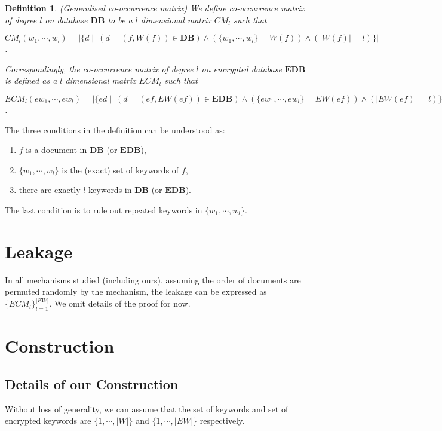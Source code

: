 \documentclass{article}
\newcommand{\db}{\textbf{DB}}
\newcommand{\edb}{\textbf{EDB}}
\newcommand{\doc}{d}
\newcommand{\edoc}{ed}
\newcommand{\file}{f}
\newcommand{\efile}{ef}
\newcommand{\kwset}{W}
\newcommand{\ekwset}{EW}
\newcommand{\kw}{w}
\newcommand{\ekw}{ew}
\newcommand{\cmatrix}{CM}
\newcommand{\ecmatrix}{ECM}
\newtheorem{definiton}{Definition}
\begin{document}
\begin{definiton}(Generalised co-occurrence matrix) We define co-occurrence matrix of degree $l$ on database $\db$ to be a $l$ dimensional matrix $\cmatrix_l$ such that
\begin{center}
	$\cmatrix_l(\kw_1, \cdots, \kw_l) = \left| \{\doc \mid \ (d = (\file, \kwset(\file))\in\db) \wedge (\{\kw_1, \cdots, \kw_l\} = \kwset(\file)) \wedge (|\kwset(\file)| = l) \} \right|$.
\end{center}

Correspondingly, the co-occurrence matrix of degree $l$ on encrypted database $\edb$ is defined as a $l$ dimensional matrix $\ecmatrix_l$ such that
\begin{center}
	$\ecmatrix_l(\ekw_1, \cdots, \ekw_l) = \left| \{\edoc \mid \ (d = (\efile, \ekwset(\efile))\in\edb) \wedge (\{\ekw_1, \cdots, \ekw_l\} = \ekwset(\efile)) \wedge (|\ekwset(\efile)| = l) \} \right|$.
\end{center}
\end{definiton}

The three conditions in the definition can be understood as:
\begin{enumerate}
	\item $\file$ is a document in $\db$ (or $\edb$),
	\item $\{\kw_1, \cdots, \kw_l\}$ is the (exact) set of keywords of $\file$,
	\item there are exactly $l$ keywords in $\db$ (or $\edb$).
\end{enumerate}
The last condition is to rule out repeated keywords in $\{\kw_1, \cdots, \kw_l\}$.




\section{Leakage}
In all mechanisms studied (including ours), assuming the order of documents are permuted randomly by the mechanism, the leakage can be expressed as $\{\ecmatrix_l\}_{l=1}^{|\ekwset|}$. We omit details of the proof for now.




\section{Construction}
\subsection{Details of our Construction}
Without loss of generality, we can assume that the set of keywords and set of encrypted keywords are $\{1, \cdots, |\kwset|\}$ and $\{1, \cdots, |\ekwset|\}$ respectively.
\end{document}
